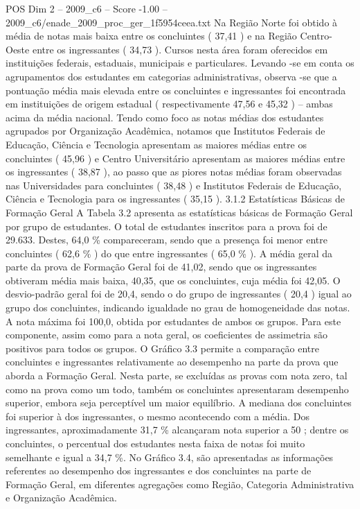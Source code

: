 \begin{textsample}{POS Dim 2 – 2009\_c6 – Score -1.00 – 2009\_c6/enade\_2009\_proc\_ger\_1f5954ceea.txt}
Na Região Norte foi obtido à média de notas mais baixa entre os concluintes ( 37,41 ) e na Região Centro-Oeste entre os ingressantes ( 34,73 ).
Cursos nesta área foram oferecidos em instituições federais, estaduais, municipais e particulares.
Levando -se em conta os agrupamentos dos estudantes em categorias administrativas, observa -se que a pontuação média mais elevada entre os concluintes e ingressantes foi encontrada em instituições de origem estadual ( respectivamente 47,56 e 45,32 ) – ambas acima da média nacional.
Tendo como foco as notas médias dos estudantes agrupados por Organização Acadêmica, notamos que Institutos Federais de Educação, Ciência e Tecnologia apresentam as maiores médias entre os concluintes ( 45,96 ) e Centro Universitário apresentam as maiores médias entre os ingressantes ( 38,87 ), ao passo que as piores notas médias foram observadas nas Universidades para concluintes ( 38,48 ) e Institutos Federais de Educação, Ciência e Tecnologia para os ingressantes ( 35,15 ). 3.1.2 Estatísticas Básicas de Formação Geral A Tabela 3.2 apresenta as estatísticas básicas de Formação Geral por grupo de estudantes.
O total de estudantes inscritos para a prova foi de 29.633.
Destes, 64,0 \% compareceram, sendo que a presença foi menor entre concluintes ( 62,6 \% ) do que entre ingressantes ( 65,0 \% ).
A média geral da parte da prova de Formação Geral foi de 41,02, sendo que os ingressantes obtiveram média mais baixa, 40,35, que os concluintes, cuja média foi 42,05.
O desvio-padrão geral foi de 20,4, sendo o do grupo de ingressantes ( 20,4 ) igual ao grupo dos concluintes, indicando igualdade no grau de homogeneidade das notas.
A nota máxima foi 100,0, obtida por estudantes de ambos os grupos.
Para este componente, assim como para a nota geral, os coeficientes de assimetria são positivos para todos os grupos.
O Gráfico 3.3 permite a comparação entre concluintes e ingressantes relativamente ao desempenho na parte da prova que aborda a Formação Geral.
Nesta parte, se excluídas as provas com nota zero, tal como na prova como um todo, também os concluintes apresentaram desempenho superior, embora seja perceptível um maior equilíbrio.
A mediana dos concluintes foi superior à dos ingressantes, o mesmo acontecendo com a média.
Dos ingressantes, aproximadamente 31,7 \% alcançaram nota superior a 50 ; dentre os concluintes, o percentual dos estudantes nesta faixa de notas foi muito semelhante e igual a 34,7 \%.
No Gráfico 3.4, são apresentadas as informações referentes ao desempenho dos ingressantes e dos concluintes na parte de Formação Geral, em diferentes agregações como Região, Categoria Administrativa e Organização Acadêmica.

\end{textsample}
